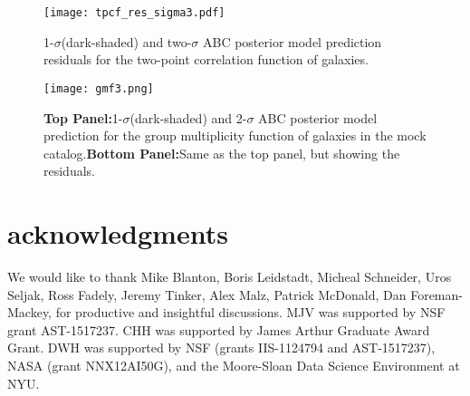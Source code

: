 \begin{figure*}
\begin{center}
  \texttt{[image: tpcf\_res\_sigma3.pdf]}
\caption{1-$\sigma$(dark-shaded) and two-$\sigma$ ABC posterior model prediction residuals
for the two-point correlation function of galaxies.}
\label{fig:2pcf-model}
\end{center}
\end{figure*}

\begin{figure*}
\begin{center}
  \texttt{[image: gmf3.png]}
\caption{{\bf Top Panel:}1-$\sigma$(dark-shaded) and 2-$\sigma$ ABC posterior model prediction 
for the group multiplicity function of galaxies in the mock catalog.{\bf Bottom Panel:}Same as the top panel, but showing the residuals.}
\label{fig:2pcf-model}
\end{center}
\end{figure*}

\section*{acknowledgments}

We would like to thank Mike Blanton, Boris Leidstadt, Micheal Schneider, Uros Seljak, Ross Fadely, Jeremy Tinker, Alex Malz, Patrick McDonald, Dan Foreman-Mackey, for productive and insightful discussions. 
MJV was supported by NSF grant AST-1517237. CHH was supported by James Arthur Graduate Award Grant.
DWH was supported by NSF (grants IIS-1124794 and AST-1517237), NASA (grant NNX12AI50G), and the Moore-Sloan Data Science Environment at NYU.





